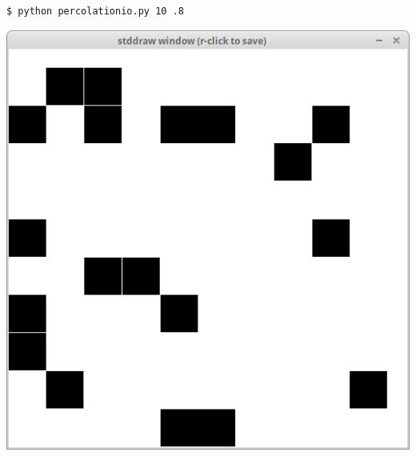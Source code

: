 \documentclass[8pt,a4paper,compress,handout]{beamer}
\begin{document}
\begin{frame}[fragile]
\begin{minipage}{160pt}
\begin{lstlisting}[language={}]
$ python percolationio.py 10 .8
\end{lstlisting}
\end{minipage}%
\begin{minipage}{140pt}
\hfill \includegraphics[scale=0.15]{figures/percolation2.png}
\end{minipage}

\smallskip


\end{frame}
\end{document}
